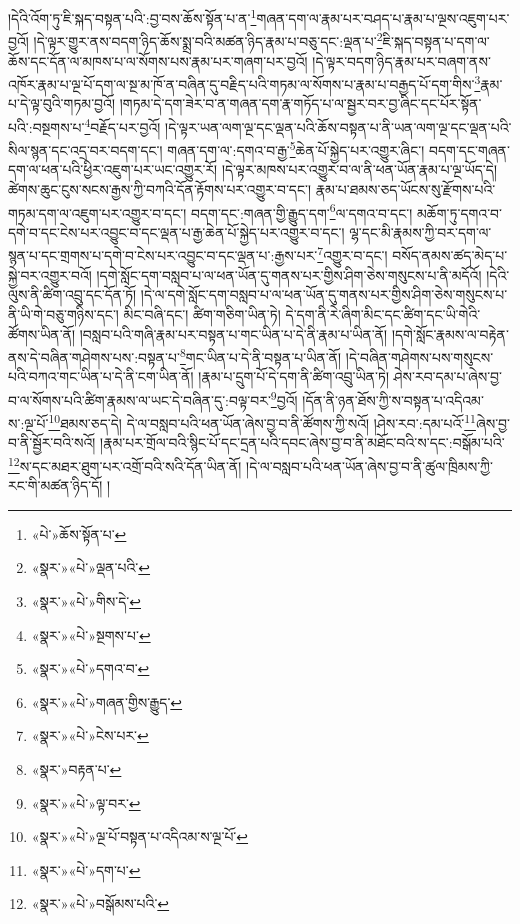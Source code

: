 །དེའི་འོག་ཏུ་ཇི་སྐད་བསྟན་པའི་:བྱ་བས་ཆོས་སྟོན་པ་ན་\footnote{«པེ་»ཆོས་སྟོན་པ་}གཞན་དག་ལ་རྣམ་པར་བཤད་པ་རྣམ་པ་ལྔས་འཇུག་པར་བྱའོ། །དེ་ལྟར་གྱུར་ནས་བདག་ཉིད་ཆོས་སྨྲ་བའི་མཚན་ཉིད་རྣམ་པ་བཅུ་དང་:ལྡན་པ་\footnote{«སྣར་»«པེ་»ལྡན་པའི་}ཇི་སྐད་བསྟན་པ་དག་ལ་ཆོས་དང་དོན་ལ་མཁས་པ་ལ་སོགས་པས་རྣམ་པར་གཞག་པར་བྱའོ། །དེ་ལྟར་བདག་ཉིད་རྣམ་པར་བཞག་ནས་འཁོར་རྣམ་པ་ལྔ་པོ་དག་ལ་སྔ་མ་ཁོ་ན་བཞིན་དུ་བརྗིད་པའི་གཏམ་ལ་སོགས་པ་རྣམ་པ་བརྒྱད་པོ་དག་གིས་\footnote{«སྣར་»«པེ་»གིས་དེ་}རྣམ་པ་དེ་ལྟ་བུའི་གཏམ་བྱའོ། །གཏམ་དེ་དག་ཟེར་བ་ན་གཞན་དག་རྣ་གཏོད་པ་ལ་སྦྱར་བར་བྱ་ཞིང་དང་པོར་སྟོན་པའི་:བསྔགས་པ་\footnote{«སྣར་»«པེ་»སྔགས་པ་}བརྗོད་པར་བྱའོ། །དེ་ལྟར་ཡན་ལག་ལྔ་དང་ལྡན་པའི་ཆོས་བསྟན་པ་ནི་ཡན་ལག་ལྔ་དང་ལྡན་པའི་སིལ་སྙན་དང་འདྲ་བར་བདག་དང་། གཞན་དག་ལ་:དགའ་བ་རྒྱ་\footnote{«སྣར་»«པེ་»དགའ་བ་}ཆེན་པོ་སྐྱེད་པར་འགྱུར་ཞིང་། བདག་དང་གཞན་དག་ལ་ཕན་པའི་ཕྱིར་འཇུག་པར་ཡང་འགྱུར་རོ། །དེ་ལྟར་མཁས་པར་འགྱུར་བ་ལ་ནི་ཕན་ཡོན་རྣམ་པ་ལྔ་ཡོད་དེ། ཚེགས་ཆུང་ངུས་སངས་རྒྱས་ཀྱི་བཀའི་དོན་རྟོགས་པར་འགྱུར་བ་དང་། རྣམ་པ་ཐམས་ཅད་ཡོངས་སུ་རྫོགས་པའི་གཏམ་དག་ལ་འཇུག་པར་འགྱུར་བ་དང་། བདག་དང་:གཞན་གྱི་རྒྱུད་དག་\footnote{«སྣར་»«པེ་»གཞན་གྱིས་རྒྱུད་}ལ་དགའ་བ་དང་། མཆོག་ཏུ་དགའ་བ་དགེ་བ་དང་ངེས་པར་འབྱུང་བ་དང་ལྡན་པ་རྒྱ་ཆེན་པོ་སྐྱེད་པར་འགྱུར་བ་དང་། ལྷ་དང་མི་རྣམས་ཀྱི་བར་དག་ལ་སྙན་པ་དང་གྲགས་པ་དགེ་བ་ངེས་པར་འབྱུང་བ་དང་ལྡན་པ་:རྒྱས་པར་\footnote{«སྣར་»«པེ་»ངེས་པར་}འགྱུར་བ་དང་། བསོད་ནམས་ཚད་མེད་པ་སྐྱེ་བར་འགྱུར་བའོ། །དགེ་སློང་དག་བསླབ་པ་ལ་ཕན་ཡོན་དུ་གནས་པར་གྱིས་ཤིག་ཅེས་གསུངས་པ་ནི་མདོའོ། །དེའི་ལུས་ནི་ཚིག་འབྲུ་དང་དོན་ཏོ། །དེ་ལ་དགེ་སློང་དག་བསླབ་པ་ལ་ཕན་ཡོན་དུ་གནས་པར་གྱིས་ཤིག་ཅེས་གསུངས་པ་ནི་ཡི་གེ་བཅུ་གཉིས་དང་། མིང་བཞི་དང་། ཚིག་གཅིག་ཡིན་ཏེ། དེ་དག་ནི་རེ་ཞིག་མིང་དང་ཚིག་དང་ཡི་གེའི་ཚོགས་ཡིན་ནོ། །བསླབ་པའི་གཞི་རྣམ་པར་བསྟན་པ་གང་ཡིན་པ་དེ་ནི་རྣམ་པ་ཡིན་ནོ། །དགེ་སློང་རྣམས་ལ་བརྟེན་ནས་དེ་བཞིན་གཤེགས་པས་:བསྟན་པ་\footnote{«སྣར་»བརྟན་པ་}གང་ཡིན་པ་དེ་ནི་བསྟན་པ་ཡིན་ནོ། །དེ་བཞིན་གཤེགས་པས་གསུངས་པའི་བཀའ་གང་ཡིན་པ་དེ་ནི་ངག་ཡིན་ནོ། །རྣམ་པ་དྲུག་པོ་དེ་དག་ནི་ཚིག་འབྲུ་ཡིན་ཏེ། ཤེས་རབ་དམ་པ་ཞེས་བྱ་བ་ལ་སོགས་པའི་ཚིག་རྣམས་ལ་ཡང་དེ་བཞིན་དུ་:བལྟ་བར་\footnote{«སྣར་»«པེ་»ལྟ་བར་}བྱའོ། །དོན་ནི་ཉན་ཐོས་ཀྱི་ས་བསྟན་པ་འདིའམ་ས་:ལྔ་པོ་\footnote{«སྣར་»«པེ་»ལྔ་པོ་བསྟན་པ་འདིའམ་ས་ལྔ་པོ་}ཐམས་ཅད་དེ། དེ་ལ་བསླབ་པའི་ཕན་ཡོན་ཞེས་བྱ་བ་ནི་ཚོགས་ཀྱི་སའོ། །ཤེས་རབ་:དམ་པའོ་\footnote{«སྣར་»«པེ་»དག་པ་}ཞེས་བྱ་བ་ནི་སྦྱོར་བའི་སའོ། །རྣམ་པར་གྲོལ་བའི་སྙིང་པོ་དང་དྲན་པའི་དབང་ཞེས་བྱ་བ་ནི་མཐོང་བའི་ས་དང་:བསྒོམ་པའི་\footnote{«སྣར་»«པེ་»བསྒོམས་པའི་}ས་དང་མཐར་ཐུག་པར་འགྲོ་བའི་སའི་དོན་ཡིན་ནོ། །དེ་ལ་བསླབ་པའི་ཕན་ཡོན་ཞེས་བྱ་བ་ནི་ཚུལ་ཁྲིམས་ཀྱི་རང་གི་མཚན་ཉིད་དོ། །
